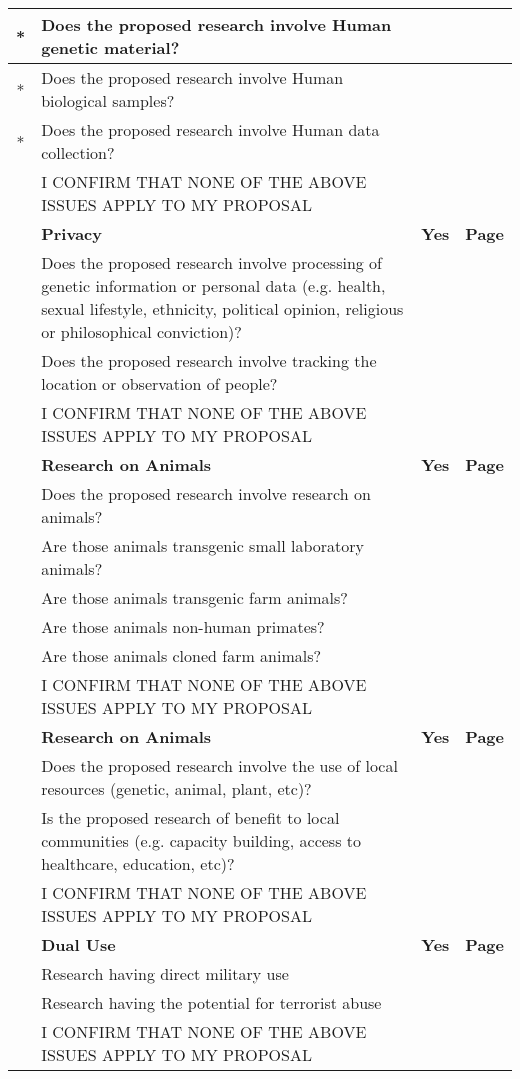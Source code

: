 \documentclass[11pt,twoside,a4paper]{article}
\begin{document}
\begin{table}
\begin{tabular}{|c|p{}|c|c|}
        * &  Does the proposed research involve Human genetic material?   & & \\\hline
        * &  Does the proposed research involve Human biological samples? & & \\\hline
        * &  Does the proposed research involve Human data collection?    & & \\\hline
        & I CONFIRM THAT NONE OF THE ABOVE ISSUES APPLY TO MY PROPOSAL    & & \\\hline
        \rowcolor{lightgray}
        & \textbf{Privacy} & \textbf{Yes} & \textbf{Page} \\\hline
        & Does the proposed research involve processing of genetic information or
        personal data (e.g. health, sexual lifestyle, ethnicity, political
        opinion, religious or philosophical conviction)?               & & \\\hline
        & Does the proposed research involve tracking the location or observation of people? & & \\\hline
        & I CONFIRM THAT NONE OF THE ABOVE ISSUES APPLY TO MY PROPOSAL & & \\\hline
        \rowcolor{lightgray}
        & \textbf{Research on Animals} & \textbf{Yes} & \textbf{Page} \\\hline
        & Does the proposed research involve research on animals?  & & \\\hline
        & Are those animals transgenic small laboratory animals?   & & \\\hline
        & Are those animals transgenic farm animals?               & & \\\hline
        & Are those animals non-human primates?                    & & \\\hline
        & Are those animals cloned farm animals?                   & & \\\hline
        & I CONFIRM THAT NONE OF THE ABOVE ISSUES APPLY TO MY PROPOSAL  & & \\\hline
        \rowcolor{lightgray}
        & \textbf{Research on Animals} & \textbf{Yes} & \textbf{Page} \\\hline
        & Does the proposed research involve the use of local resources
        (genetic, animal, plant, etc)? &  & \\\hline
        & Is the proposed research of benefit to local communities (e.g. capacity building, access to healthcare, education, etc)? &  & \\\hline
        & I CONFIRM THAT NONE OF THE ABOVE ISSUES APPLY TO MY PROPOSAL   & & \\\hline
        \rowcolor{lightgray}
        & \textbf{Dual Use} & \textbf{Yes} & \textbf{Page} \\\hline
        & Research having direct military use                            & & \\\hline
        & Research having the potential for terrorist abuse              & & \\\hline
        & I CONFIRM THAT NONE OF THE ABOVE ISSUES APPLY TO MY PROPOSAL   & & \\\hline
    \end{tabular}
\end{table}
\end{document}
